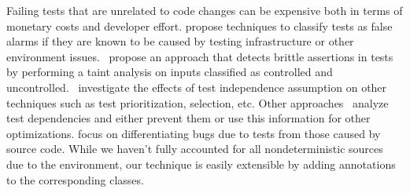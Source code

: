 Failing tests that are unrelated to code changes can be expensive both in terms of monetary costs and
developer effort. \cite{Herzig:2015:EDF:2819009.2819018} propose techniques to classify tests as false alarms
if they are known to be caused by testing infrastructure or other environment issues.~\cite{Huo:2014:IOQ:2635868.2635917}
propose an approach that detects brittle assertions in tests by performing a taint analysis on inputs classified as 
controlled and uncontrolled.~\cite{ZhangJWMLEN2014} investigate the effects of test independence assumption
on other techniques such as test prioritization, selection, etc. Other approaches~\cite{BellKMD2015,Gyori:2015:RTD:2771783.2771793}
analyze test dependencies and either prevent them or use this information for other optimizations.
\cite{Dan:2013:10.1007/978-3-642-39038-8_25,Vahabzadeh:2015:7332456} focus on differentiating bugs due to tests
from those caused by source code. While we haven't fully accounted for all nondeterministic sources due
to the environment, our technique is easily extensible by adding annotations to the corresponding classes.


